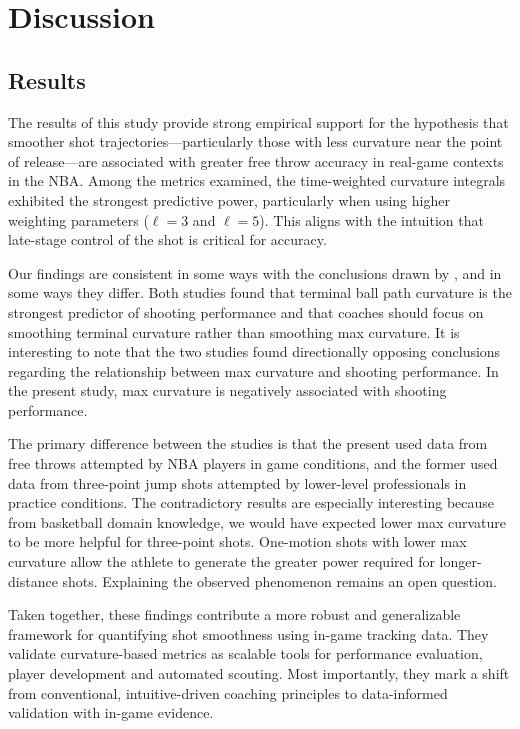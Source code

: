 \documentclass{article}
\begin{document}
\section{Discussion}

    \subsection{Results}
      
      The results of this study provide strong empirical support for the hypothesis that smoother shot trajectories---particularly those with less curvature near the point of release---are associated with greater free throw accuracy in real-game contexts in the NBA. Among the metrics examined, the time-weighted curvature integrals exhibited the strongest predictive power, particularly when using higher weighting parameters (\(\ell=3\) and \(\ell=5\)). This aligns with the intuition that late-stage control of the shot is critical for accuracy.
      
      Our findings are consistent in some ways with the conclusions drawn by \citet{slegers_role_2024}, and in some ways they differ. Both studies found that terminal ball path curvature is the strongest predictor of shooting performance and that coaches should focus on smoothing terminal curvature rather than smoothing max curvature. It is interesting to note that the two studies found directionally opposing conclusions regarding the relationship between max curvature and shooting performance. In the present study, max curvature is negatively associated with shooting performance.

      The primary difference between the studies is that the present used data from free throws attempted by NBA players in game conditions, and the former used data from three-point jump shots attempted by lower-level professionals in practice conditions. The contradictory results are especially interesting because from basketball domain knowledge, we would have expected lower max curvature to be more helpful for three-point shots. One-motion shots with lower max curvature allow the athlete to generate the greater power required for longer-distance shots. Explaining the observed phenomenon remains an open question. 
      
      Taken together, these findings contribute a more robust and generalizable framework for quantifying shot smoothness using in-game tracking data. They validate curvature-based metrics as scalable tools for performance evaluation, player development and automated scouting. Most importantly, they mark a shift from conventional, intuitive-driven coaching principles to data-informed validation with in-game evidence.
\end{document}
